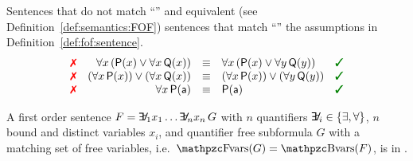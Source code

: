 \begin{example}Sentences that do not match “\xmark”
	and {equivalent (see Definition~\vref{def:semantics:FOF})}
	sentences that match “\cmark”
	the assumptions in Definition~\vref{def:fof:sentence}.
	\[
	\begin{array}{rrcll}
		 \text{\color{colLo}{\xmark}}
		& \forall x\, ({\mP(x) \lor \forall x\, {\mQ(x)}})
		& {\equiv}
		& \forall x\, ({\mP(x) \lor \forall y\, {\mQ(y)}})
		& \text{\color{colHi}{\cmark}}
		\\ \text{\color{colLo}{\xmark}}
		& (\forall x\, {\mP(x)}) \lor (\forall x\, {\mQ(x)})
		& {\equiv}
		& (\forall x\, {\mP(x)}) \lor (\forall y\, {\mQ(y)})
		& \text{\color{colHi}{\cmark}}
		\\
		\text{\color{colLo}{\xmark}}
		&  \forall x\, {\mP(\ma)}
		& {\equiv}
		& \mP(\ma)
		& \text{\color{colHi}{\cmark}}
	\end{array}
	\]

\end{example}

\begin{definition}[\PNF]
	A first order sentence \( F = \quantify_1 x_1 \ldots \quantify_n x_n\, G \)
	with \( n \) quantifiers \( \quantify_i \in \{ \exists, \forall \} \),
	\( n \) bound and distinct variables \( x_i \),
	and quantifier free subformula \( G \) with
	a matching set of free variables, i.e.~\( \fvar(G) = \bvar(F) \),
	is in .
\end{definition}


